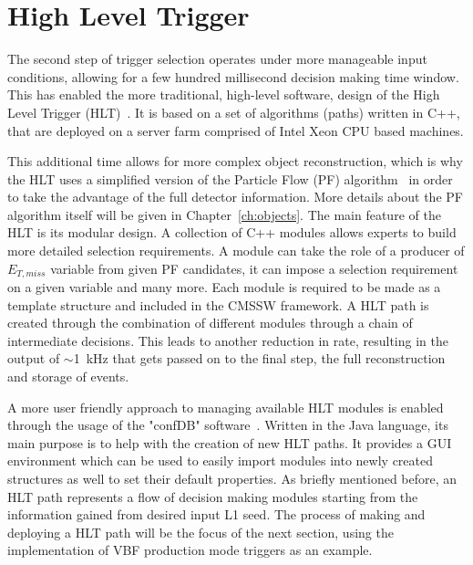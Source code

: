 \section{High Level Trigger}

\hspace{10pt} The second step of trigger selection operates under more manageable input conditions, allowing for a few hundred millisecond decision making time window. This has enabled the more traditional, high-level software, design of the High Level Trigger (HLT)~\cite{HLT_performance}. It is based on a set of algorithms (paths) written in C++, that are deployed on a server farm comprised of Intel Xeon CPU based machines.

\hspace{10pt} This additional time allows for more complex object reconstruction, which is why the HLT uses a simplified version of the Particle Flow (PF) algorithm~\cite{PF:Florian} in order to take the advantage of the full detector information. More details about the PF algorithm itself will be given in Chapter~\ref{ch:objects}. The main feature of the HLT is its modular design. A collection of C++ modules allows experts to build more detailed selection requirements. A module can take the role of a producer of $E_{T,miss}$ variable from given PF candidates, it can impose a selection requirement on a given variable and many more. Each module is required to be made as a template structure and included in the CMSSW framework. A HLT path is created through the combination of different modules through a chain of intermediate decisions. This leads to another reduction in rate, resulting in the output of $\sim$1~kHz that gets passed on to the final step, the full reconstruction and storage of events.

\hspace{10pt} A more user friendly approach to managing available HLT modules is enabled through the usage of the "confDB" software~\cite{confdb}. Written in the Java language, its main purpose is to help with the creation of new HLT paths. It provides a GUI environment which can be used to easily import modules into newly created structures as well to set their default properties. As briefly mentioned before, an HLT path represents a flow of decision making modules starting from the information gained from desired input L1 seed. The process of making and deploying a HLT path will be the focus of the next section, using the implementation of VBF production mode triggers as an example.


